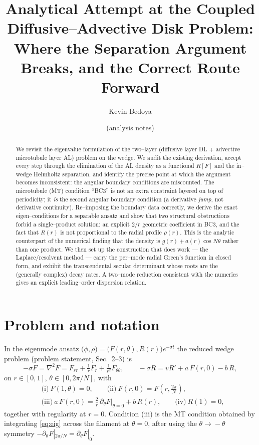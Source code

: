 \documentclass{article}
\title{Analytical Attempt at the Coupled Diffusive--Advective Disk Problem:\\
Where the Separation Argument Breaks, and the Correct Route Forward}
\author{Kevin Bedoya \and (analysis notes)}
\begin{document}
\maketitle

\begin{abstract}
We revisit the eigenvalue formulation of the two--layer (diffusive layer DL +
advective microtubule layer AL) problem on the wedge. We audit the existing
derivation, accept every step through the elimination of the AL density as a
functional $R[F]$ and the in--wedge Helmholtz separation, and identify the
precise point at which the argument becomes inconsistent: the angular boundary
conditions are miscounted. The microtubule (MT) condition ``BC3'' is not an
extra constraint layered on top of periodicity; it \emph{is} the second
angular boundary condition (a derivative \emph{jump}, not derivative
continuity). Re--imposing the boundary data correctly, we derive the exact
eigen--conditions for a separable ansatz and show that two structural
obstructions forbid a single--product solution: an explicit $2/r$ geometric
coefficient in BC3, and the fact that $R(r)$ is not proportional to the radial
profile $\rho(r)$. This is the analytic counterpart of the numerical finding
that the density is $g(r)+a(r)\cos N\theta$ rather than one product. We then
set up the construction that does work --- the Laplace/resolvent method ---
carry the per--mode radial Green's function in closed form, and exhibit the
transcendental secular determinant whose roots are the (generally complex)
decay rates. A two--mode reduction consistent with the numerics gives an
explicit leading--order dispersion relation.
\end{abstract}

\section{Problem and notation}

In the eigenmode ansatz $\bigl(\phi,\rho\bigr)=\bigl(F(r,\theta),R(r)\bigr)e^{-\sigma t}$
the reduced wedge problem (problem statement, Sec.~2--3) is
\begin{equation}
-\sigma F=\nabla^{2}F
=F_{rr}+\tfrac1r F_r+\tfrac1{r^{2}}F_{\theta\theta},
\qquad
-\sigma R = v R' + a\,F(r,0) - b\,R,
\label{eq:eig}
\end{equation}
on $r\in[0,1]$, $\theta\in[0,2\pi/N]$, with
\begin{align}
&\text{(i)}\ F(1,\theta)=0,\qquad
\text{(ii)}\ F(r,0)=F\!\left(r,\tfrac{2\pi}{N}\right),\nonumber\\
&\text{(iii)}\ a\,F(r,0)=\frac{2}{r}\,\partial_\theta F\big|_{\theta=0}+b\,R(r),
\qquad
\text{(iv)}\ R(1)=0,
\label{eq:bcs}
\end{align}
together with regularity at $r=0$. Condition (iii) is the MT condition obtained
by integrating \eqref{eq:eig} across the filament at $\theta=0$, after using the
$\theta\!\to\!-\theta$ symmetry
$-\partial_\theta F|_{2\pi/N}=\partial_\theta F|_{0}$.
\end{document}

